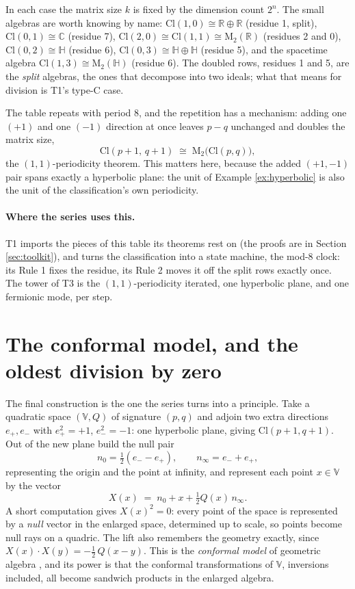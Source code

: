 \documentclass[11pt]{article}
\theoremstyle{plain}
\theoremstyle{definition}
\newcommand{\Cl}{\mathrm{Cl}}
\newcommand{\R}{\mathbb{R}}
\newcommand{\C}{\mathbb{C}}
\newcommand{\HH}{\mathbb{H}}
\newcommand{\Mat}{\mathrm{M}}
\begin{document}
\noindent In each case the matrix size $k$ is fixed by the dimension count $2^{n}$. The small algebras are worth knowing by name: $\Cl(1,0) \cong \R \oplus \R$ (residue 1, split), $\Cl(0,1) \cong \C$ (residue 7), $\Cl(2,0) \cong \Cl(1,1) \cong \Mat_2(\R)$ (residues 2 and 0), $\Cl(0,2) \cong \HH$ (residue 6), $\Cl(0,3) \cong \HH \oplus \HH$ (residue 5), and the spacetime algebra $\Cl(1,3) \cong \Mat_2(\HH)$ (residue 6). The doubled rows, residues 1 and 5, are the \emph{split} algebras, the ones that decompose into two ideals; what that means for division is T1's type-C case.

The table repeats with period 8, and the repetition has a mechanism: adding one $(+1)$ and one $(-1)$ direction at once leaves $p - q$ unchanged and doubles the matrix size,
\[
\Cl(p{+}1,\, q{+}1) \;\cong\; \Mat_2\bigl(\Cl(p,q)\bigr),
\]
the $(1,1)$-periodicity theorem. This matters here, because the added $(+1,-1)$ pair spans exactly a hyperbolic plane: the unit of Example \ref{ex:hyperbolic} is also the unit of the classification's own periodicity.

\paragraph{Where the series uses this.} T1 imports the pieces of this table its theorems rest on (the proofs are in Section \ref{sec:toolkit}), and turns the classification into a state machine, the mod-8 clock: its Rule 1 fixes the residue, its Rule 2 moves it off the split rows exactly once. The tower of T3 is the $(1,1)$-periodicity iterated, one hyperbolic plane, and one fermionic mode, per step.

\section{The conformal model, and the oldest division by zero}\label{sec:conformal}

The final construction is the one the series turns into a principle. Take a quadratic space $(\mathbb{V}, Q)$ of signature $(p,q)$ and adjoin two extra directions $e_+, e_-$ with $e_+^{2} = +1$, $e_-^{2} = -1$: one hyperbolic plane, giving $\Cl(p{+}1, q{+}1)$. Out of the new plane build the null pair
\[
n_0 = \tfrac12(e_- - e_+), \qquad n_\infty = e_- + e_+ ,
\]
representing the origin and the point at infinity, and represent each point $x \in \mathbb{V}$ by the vector
\[
X(x) \;=\; n_0 + x + \tfrac12 Q(x)\, n_\infty .
\]
A short computation gives $X(x)^{2} = 0$: every point of the space is represented by a \emph{null} vector in the enlarged space, determined up to scale, so points become null rays on a quadric. The lift also remembers the geometry exactly, since $X(x) \cdot X(y) = -\tfrac12\,Q(x - y)$. This is the \emph{conformal model} of geometric algebra \cite{Hestenes2001, DFM2007, DoranLasenby2003}, and its power is that the conformal transformations of $\mathbb{V}$, inversions included, all become sandwich products in the enlarged algebra.
\end{document}
